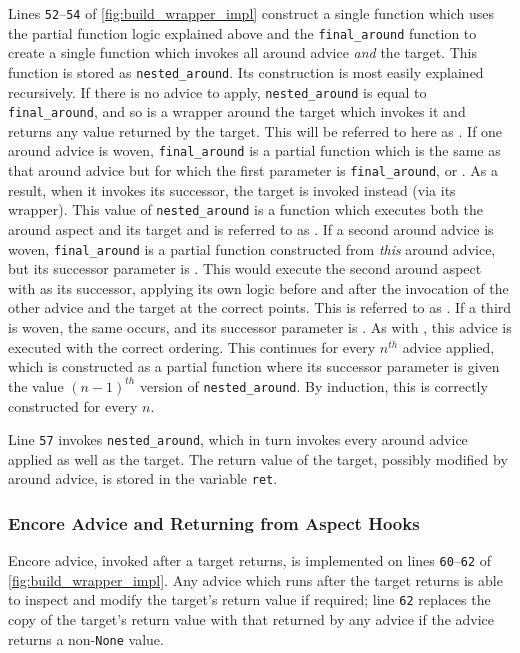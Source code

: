 Lines \texttt{52}--\texttt{54} of \cref{fig:build_wrapper_impl} construct a single function which uses the
partial function logic explained above and the \lstinline{final_around} function
to create a single function which invokes all around advice \emph{and} the
target. This function is stored as \lstinline{nested_around}. Its construction
is most easily explained recursively. If there is no advice to apply,
\lstinline{nested_around} is equal to \lstinline{final_around}, and so is a
wrapper around the target which invokes it and returns any value returned by the
target. This will be referred to here as . If one around advice is
woven, \lstinline{final_around} is a partial function which is the same as that
around advice but for which the first parameter is \lstinline{final_around}, or
. As a result, when it invokes its successor, the target is invoked
instead (via its wrapper). This value of \lstinline{nested_around} is a function
which executes both the around aspect and its target and is referred to as
. If a second around advice is woven, \lstinline{final_around} is a
partial function constructed from \emph{this} around advice, but its successor
parameter is . This would execute the second around aspect with
 as its successor, applying its own logic before and after the
invocation of the other advice and the target at the correct points. This is
referred to as . If a third is woven, the same occurs, and its
successor parameter is . As with , this advice is executed
with the correct ordering. This continues for every $n^{th}$ advice
applied, which is constructed as a partial function where its successor
parameter is given the value $(n-1)^{th}$ version of
\lstinline{nested_around}. By induction, this is correctly constructed for every $n$.

Line \texttt{57} invokes \lstinline{nested_around}, which in turn invokes every
around advice applied as well as the target. The return value of the target,
possibly modified by around advice, is stored in the variable \lstinline{ret}.


\subsubsection{Encore Advice and Returning from Aspect Hooks}

Encore advice, invoked after a target returns, is implemented on lines
\texttt{60}--\texttt{62} of \cref{fig:build_wrapper_impl}. Any advice
which runs after the target returns is able to inspect and modify the target's
return value if required; line \texttt{62} replaces the copy of the target's
return value with that returned by any advice if the advice returns a
non-\lstinline{None} value.

